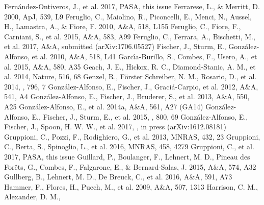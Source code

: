 \documentclass{pasa}%
\begin{document}
\begin{thebibliography}{}
  Fern\'andez-Ontiveros,
   J., et al. 2017, PASA, this issue
   Ferrarese, L., \& Merritt,
    D. 2000, ApJ, 539, L9
   Feruglio, C., Maiolino, R.,
    Piconcelli, E., Menci, N., Aussel, H., Lamastra, A., \& Fiore, F.
    2010, A\&A, 518, L155 
   Feruglio, C., Fiore, F., Carniani,
    S., et al. 2015, A\&A, 583, A99
   Feruglio, C., Ferrara, A.,
    Bischetti, M., et al. 2017, A\&A, submitted (arXiv:1706.05527)
   Fischer, J., Sturm, E.,
    Gonz\'alez-Alfonso, et al. 2010, A\&A, 518, L41
   Garc\'{\i}a-Burillo, S.,
    Combes, F., Usero, A., et al. 2015, A\&A, 580, A35
   Geach, J. E., Hickox, R. C.,
    Diamond-Stanic, A. M., et al. 2014, Nature, 516, 68
   Genzel, R., F\"orster Schreiber, N. M.,
    Rosario, D., et al. 2014, \apj, 796, 7
   Gonz\'alez-Alfonso,
    E., Fischer, J., Graci\'a-Carpio, et al. 2012, A\&A, 541, A4
   Gonz\'alez-Alfonso,
    E., Fischer, J., Bruderer, S., et al. 2013, A\&A, 550, A25
   Gonz\'alez-Alfonso,
    E., et al. 2014a, A\&A, 561, A27 (GA14)
   Gonz\'alez-Alfonso,
    E., Fischer, J., Sturm, E., et al. 2015, \apj, 800, 69 
   Gonz\'alez-Alfonso,
    E., Fischer, J., Spoon, H. W. W., et al. 2017, \apj, in press
    (arXiv:1612.08181) 
   Gruppioni, C., Pozzi, F.,
    Rodighiero, G., et al. 2013, MNRAS, 432, 23
   Gruppioni, C., Berta, S., Spinoglio,
    L., et al. 2016, MNRAS, 458, 4279
   Gruppioni, C., et al. 2017, PASA,
    this issue
   Guillard, P., Boulanger, F., Lehnert,
    M. D., Pineau des For\^ets, G., Combes, F., Falgarone, E., \&
    Bernard-Salas, J. 2015, A\&A, 574, A32
   Gullberg, B., Lehnert, M. D., De
    Breuck, C., et al. 2016,  A\&A, 591, A73
   Hammer, F., Flores, H., Puech, M., et
    al. 2009, A\&A, 507, 1313
   Harrison, C. M., Alexander, D. M.,

\end{thebibliography}
\end{document}
